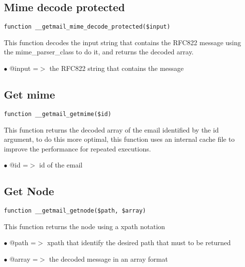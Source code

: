 \documentclass[a4paper]{book}
\begin{document}
\hypertarget{toc537}{}
\subsection{Mime decode protected}

\begin{lstlisting}
function __getmail_mime_decode_protected($input)
\end{lstlisting}

This function decodes the input string that contains the RFC822 message
using the mime\_parser\_class to do it, and returns the decoded array.

\begin{compactitem}
\item[\color{myblue}$\bullet$] @input =$>$ the RFC822 string that contains the message
\end{compactitem}

\hypertarget{toc538}{}
\subsection{Get mime}

\begin{lstlisting}
function __getmail_getmime($id)
\end{lstlisting}

This function returns the decoded array of the email identified by the id
argument, to do this more optimal, this function uses an internal cache
file to improve the performance for repeated executions.

\begin{compactitem}
\item[\color{myblue}$\bullet$] @id  =$>$ id of the email
\end{compactitem}

\hypertarget{toc539}{}
\subsection{Get Node}

\begin{lstlisting}
function __getmail_getnode($path, $array)
\end{lstlisting}

This function returns the node using a xpath notation

\begin{compactitem}
\item[\color{myblue}$\bullet$] @path  =$>$ xpath that identify the desired path that must to be returned
\item[\color{myblue}$\bullet$] @array =$>$ the decoded message in an array format
\end{compactitem}
\end{document}
